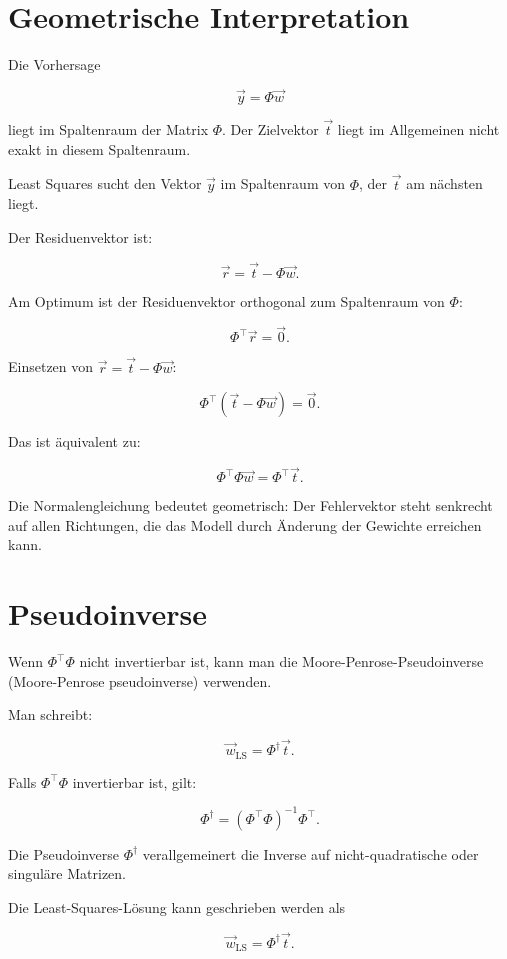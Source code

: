 \section{Geometrische Interpretation}

Die Vorhersage

\[
    \vec{y}
    =
    \Phi\vec{w}
\]

liegt im Spaltenraum der Matrix \(\Phi\).
Der Zielvektor \(\vec{t}\) liegt im Allgemeinen nicht exakt in diesem Spaltenraum.

Least Squares sucht den Vektor \(\vec{y}\) im Spaltenraum von \(\Phi\), der \(\vec{t}\) am nächsten liegt.

Der Residuenvektor ist:

\[
    \vec{r}
    =
    \vec{t}
    -
    \Phi\vec{w}.
\]

Am Optimum ist der Residuenvektor orthogonal zum Spaltenraum von \(\Phi\):

\[
    \Phi^{\top}\vec{r}
    =
    \vec{0}.
\]

Einsetzen von \(\vec{r}=\vec{t}-\Phi\vec{w}\):

\[
    \Phi^{\top}
    (
        \vec{t}-\Phi\vec{w}
    )
    =
    \vec{0}.
\]

Das ist äquivalent zu:

\[
    \Phi^{\top}\Phi\vec{w}
    =
    \Phi^{\top}\vec{t}.
\]

\begin{notebox}
Die Normalengleichung bedeutet geometrisch:
Der Fehlervektor steht senkrecht auf allen Richtungen, die das Modell durch Änderung der Gewichte erreichen kann.
\end{notebox}

\section{Pseudoinverse}

Wenn \(\Phi^{\top}\Phi\) nicht invertierbar ist, kann man die Moore-Penrose-Pseudoinverse (Moore-Penrose pseudoinverse) verwenden.

Man schreibt:

\[
    \vec{w}_{\mathrm{LS}}
    =
    \Phi^{\dagger}\vec{t}.
\]

Falls \(\Phi^{\top}\Phi\) invertierbar ist, gilt:

\[
    \Phi^{\dagger}
    =
    (\Phi^{\top}\Phi)^{-1}\Phi^{\top}.
\]

\begin{definitionbox}
Die Pseudoinverse \(\Phi^{\dagger}\) verallgemeinert die Inverse auf nicht-quadratische oder singuläre Matrizen.

Die Least-Squares-Lösung kann geschrieben werden als

\[
    \vec{w}_{\mathrm{LS}}
    =
    \Phi^{\dagger}\vec{t}.
\]
\end{definitionbox}

